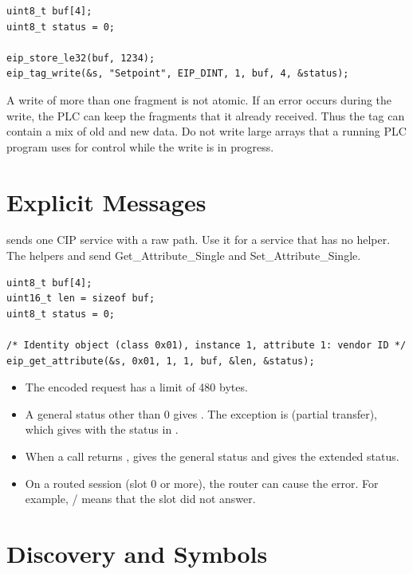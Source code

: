 \begin{lstlisting}
uint8_t buf[4];
uint8_t status = 0;

eip_store_le32(buf, 1234);
eip_tag_write(&s, "Setpoint", EIP_DINT, 1, buf, 4, &status);
\end{lstlisting}

\begin{caution}
A write of more than one fragment is not atomic. If an error occurs during
the write, the PLC can keep the fragments that it already received. Thus the
tag can contain a mix of old and new data. Do not write large arrays that a
running PLC program uses for control while the write is in progress.
\end{caution}

\section{Explicit Messages}\label{sec:explicit}

 sends one CIP service with a raw path. Use it for a service that
has no helper. The helpers  and
 send Get\_Attribute\_Single and
Set\_Attribute\_Single.

\begin{lstlisting}
uint8_t buf[4];
uint16_t len = sizeof buf;
uint8_t status = 0;

/* Identity object (class 0x01), instance 1, attribute 1: vendor ID */
eip_get_attribute(&s, 0x01, 1, 1, buf, &len, &status);
\end{lstlisting}

\begin{itemize}
  \item The encoded request has a limit of 480 bytes.
  \item A general status other than 0 gives . The
        exception is  (partial transfer), which gives 
        with the status in .
  \item When a call returns , 
        gives the general status and  gives the
        extended status.
  \item On a routed session (slot 0 or more), the router can cause the error.
        For example,  /  means that the slot did not answer.
\end{itemize}

\section{Discovery and Symbols}\label{sec:discovery}

